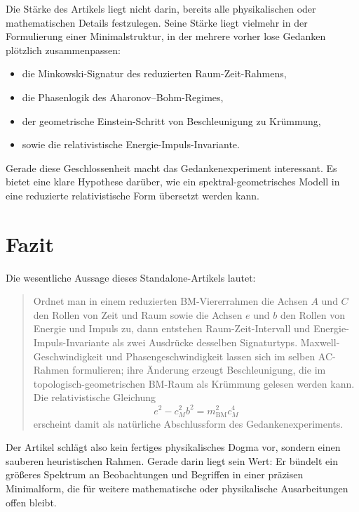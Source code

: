 \documentclass[11pt,a4paper]{article}
\theoremstyle{definition}
\theoremstyle{plain}
\begin{document}
	Die Stärke des Artikels liegt nicht darin, bereits alle physikalischen oder mathematischen Details festzulegen. Seine Stärke liegt vielmehr in der Formulierung einer Minimalstruktur, in der mehrere vorher lose Gedanken plötzlich zusammenpassen:
	\begin{itemize}[leftmargin=2em]
		\item die Minkowski-Signatur des reduzierten Raum-Zeit-Rahmens,
		\item die Phasenlogik des Aharonov--Bohm-Regimes,
		\item der geometrische Einstein-Schritt von Beschleunigung zu Krümmung,
		\item sowie die relativistische Energie-Impuls-Invariante.
	\end{itemize}
	
	Gerade diese Geschlossenheit macht das Gedankenexperiment interessant. Es bietet eine klare Hypothese darüber, wie ein spektral-geometrisches Modell in eine reduzierte relativistische Form übersetzt werden kann.
	
	\section{Fazit}
	
	Die wesentliche Aussage dieses Standalone-Artikels lautet:
	\begin{quote}
		Ordnet man in einem reduzierten BM-Viererrahmen die Achsen $A$ und $C$ den Rollen von Zeit und Raum sowie die Achsen $e$ und $b$ den Rollen von Energie und Impuls zu, dann entstehen Raum-Zeit-Intervall und Energie-Impuls-Invariante als zwei Ausdrücke desselben Signaturtyps. Maxwell-Geschwindigkeit und Phasengeschwindigkeit lassen sich im selben AC-Rahmen formulieren; ihre Änderung erzeugt Beschleunigung, die im topologisch-geometrischen BM-Raum als Krümmung gelesen werden kann. Die relativistische Gleichung
		\[
		e^2 - c_M^2 b^2 = m_{\mathrm{BM}}^2 c_M^4
		\]
		erscheint damit als natürliche Abschlussform des Gedankenexperiments.
	\end{quote}
	
	Der Artikel schlägt also kein fertiges physikalisches Dogma vor, sondern einen sauberen heuristischen Rahmen. Gerade darin liegt sein Wert: Er bündelt ein größeres Spektrum an Beobachtungen und Begriffen in einer präzisen Minimalform, die für weitere mathematische oder physikalische Ausarbeitungen offen bleibt.
	
\end{document}
